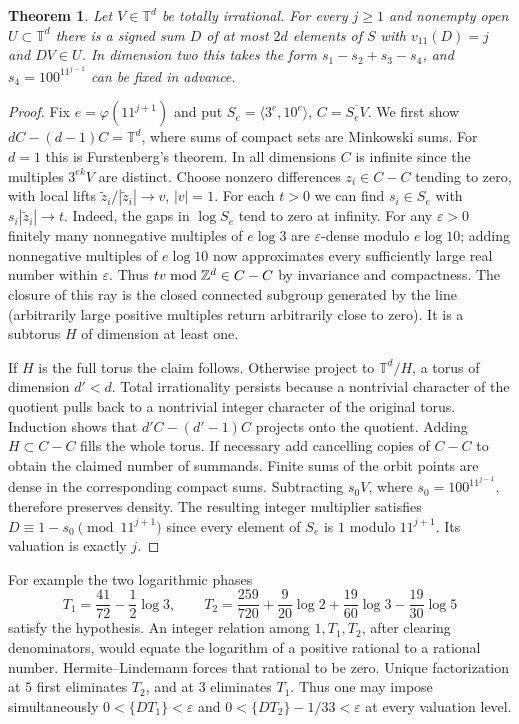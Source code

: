 \documentclass[11pt,a4paper]{article}
\newtheorem{theorem}{Theorem}[section]
\theoremstyle{definition}\newtheorem{definition}[theorem]{Definition}\newtheorem{example}[theorem]{Example}
\theoremstyle{remark}\newtheorem{remark}[theorem]{Remark}
\begin{document}
\begin{theorem}\label{thm:signed-smooth-target}
Let $V\in\mathbb T^d$ be totally irrational. For every $j\ge1$ and nonempty
open $U\subset\mathbb T^d$ there is a signed sum $D$ of at most $2d$ elements
of $S$ with $v_{11}(D)=j$ and $DV\in U$. In dimension two this takes the
form $s_1-s_2+s_3-s_4$, and $s_4=100^{11^{j-1}}$ can be fixed in advance.
\end{theorem}
\begin{proof}
Fix $e=\varphi(11^{j+1})$ and put $S_e=\langle3^e,10^e\rangle$,
$C=\overline{S_eV}$. We first show $dC-(d-1)C=\mathbb T^d$, where sums
of compact sets are Minkowski sums. For $d=1$ this is Furstenberg's theorem.
In all dimensions $C$ is infinite since the multiples $3^{ek}V$ are distinct.
Choose nonzero differences $z_i\in C-C$ tending to zero, with local lifts
$\tilde z_i/|\tilde z_i|\to v$, $|v|=1$. For each $t>0$ we can find
$s_i\in S_e$ with $s_i|\tilde z_i|\to t$. Indeed, the gaps in $\log S_e$ tend
to zero at infinity. For any $\varepsilon>0$ finitely many nonnegative
multiples of $e\log3$ are $\varepsilon$-dense modulo $e\log10$; adding
nonnegative multiples of $e\log10$ now approximates every sufficiently large
real number within $\varepsilon$. Thus $tv\bmod\mathbb Z^d\in C-C$ by invariance and
compactness. The closure of this ray is the closed connected subgroup generated
by the line (arbitrarily large positive multiples return arbitrarily close
to zero). It is a subtorus $H$ of dimension at least one.

If $H$ is the full torus the claim follows. Otherwise project to
$\mathbb T^d/H$, a torus of dimension $d'<d$. Total irrationality persists
because a nontrivial character of the quotient pulls back to a nontrivial
integer character of the original torus. Induction shows that
$d'C-(d'-1)C$ projects onto the quotient. Adding $H\subset C-C$ fills the
whole torus. If necessary add cancelling copies of $C-C$ to obtain the
claimed number of summands. Finite sums of the orbit points are dense in
the corresponding compact sums. Subtracting $s_0V$, where
$s_0=100^{11^{j-1}}$, therefore preserves density. The resulting integer
multiplier satisfies $D\equiv1-s_0\pmod{11^{j+1}}$ since every element of
$S_e$ is $1$ modulo $11^{j+1}$. Its valuation is exactly $j$.
\end{proof}
For example the two logarithmic phases
\[
 T_1=\frac{41}{72}-\frac12\log3,\qquad
 T_2=\frac{259}{720}+\frac9{20}\log2+\frac{19}{60}\log3-\frac{19}{30}\log5
\]
satisfy the hypothesis. An integer relation among $1,T_1,T_2$, after
clearing denominators, would equate the logarithm of a positive rational to
a rational number. Hermite--Lindemann forces that rational to be zero.
Unique factorization at $5$ first eliminates $T_2$, and at $3$ eliminates
$T_1$. Thus one may impose simultaneously $0<\{DT_1\}<\varepsilon$ and
$0<\{DT_2\}-1/33<\varepsilon$ at every valuation level.
\end{document}

